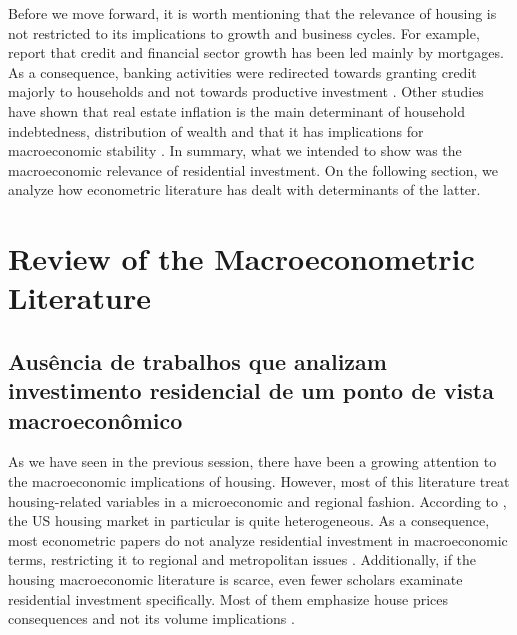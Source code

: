 \documentclass[12pt, a4paper]{article}
\begin{document}
Before we move forward, it is worth mentioning that the relevance of housing is not restricted to its implications to growth and business cycles.
For example, \textcite{jorda_great_2016} report that credit and financial sector growth has been led mainly by mortgages. 
As a consequence, banking activities were redirected towards granting credit majorly to households and not towards productive investment \cites{erturk_banks_2007}{kohl_more_2018}.
Other studies have shown that real estate inflation is the main determinant of household indebtedness, distribution of wealth and that it has implications for macroeconomic stability \cites{ryoo_household_2015}{stockhammer_debt-driven_2016}{barnes_private_2016}{johnston_global_2017}{mian_household_2017}{anderson_politics_2020}{fuller_housing_2020}. 
In summary, what we intended to show was the macroeconomic relevance of residential investment.
On the following section, we analyze how econometric literature has dealt with determinants of the latter.
\section{Review of the Macroeconometric Literature}
\label{sec:orgae53656}
\label{sec:empirical_review}
\subsection{Ausência de trabalhos que analizam investimento residencial de um ponto de vista macroeconômico}
\label{sec:org279f055}
As we have seen in the previous session, there have been a growing attention to the macroeconomic implications of housing.
However, most of this literature treat housing-related variables in a microeconomic and regional fashion.
According to \textcite{arestis_u.s._2008}, the US housing market in particular is quite heterogeneous.
As a consequence, most econometric papers do not analyze residential investment in macroeconomic terms, restricting it to regional and metropolitan issues \cite{arestis_u.s._2008}.
Additionally, if the housing macroeconomic literature is scarce, even fewer scholars examinate residential investment specifically.
Most of them emphasize house prices consequences and not its volume implications \cites{arestis_residential_2015}{perez_Montiel_2021}.
\end{document}
